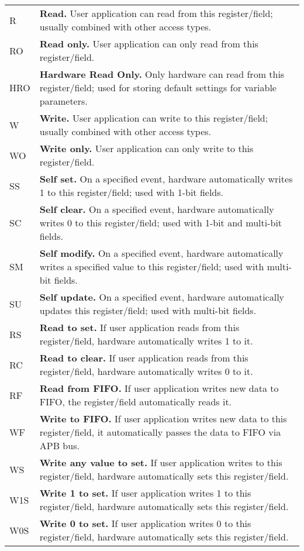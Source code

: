 \begin{longtable}[c]{ R{1cm} p{13cm} }

R & \textbf{Read.} 
	User application can read from this register/field; usually combined with other access types. \\
RO & \textbf{Read only.} 
	User application can only read from this register/field. \\
HRO & \textbf{Hardware Read Only.} 
	Only hardware can read from this register/field; used for storing default settings for variable parameters. \\
W & \textbf{Write.} 
	User application can write to this register/field; usually combined with other access types. \\
WO & \textbf{Write only.} 
	User application can only write to this register/field. \\

SS & \textbf{Self set.} 
	On a specified event, hardware automatically writes 1 to this register/field; used with 1-bit fields. \\
SC & \textbf{Self clear.} 
	On a specified event, hardware automatically writes 0 to this register/field; used with 1-bit and multi-bit fields. \\
SM & \textbf{Self modify.} 
	On a specified event, hardware automatically writes a specified value to this register/field; used with multi-bit fields. \\
SU & \textbf{Self update.} 
	On a specified event, hardware automatically updates this register/field; used with multi-bit fields. \\

RS & \textbf{Read to set.} 
	If user application reads from this register/field, hardware automatically writes 1 to it. \\
RC & \textbf{Read to clear.} 
	If user application reads from this register/field, hardware automatically writes 0 to it. \\
RF & \textbf{Read from FIFO.} 
	If user application writes new data to FIFO, the register/field automatically reads it. \\

WF & \textbf{Write to FIFO.} 
	If user application writes new data to this register/field, it automatically passes the data to FIFO via APB bus. \\

WS & \textbf{Write any value to set.} 
	If user application writes to this register/field, hardware automatically sets this register/field. \\
W1S & \textbf{Write 1 to set.} 
	If user application writes 1 to this register/field, hardware automatically sets this register/field. \\
W0S & \textbf{Write 0 to set.} 
	If user application writes 0 to this register/field, hardware automatically sets this register/field. \\


\end{longtable}
